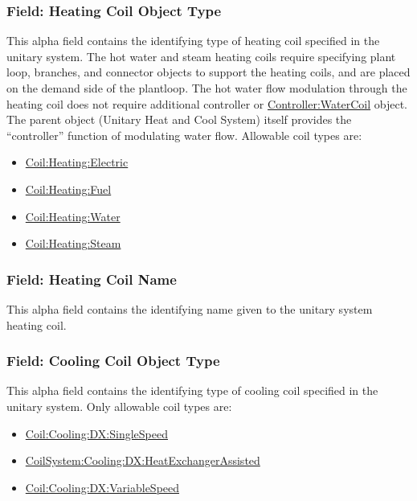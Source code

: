 \subsubsection{Field: Heating Coil Object Type}\label{field-heating-coil-object-type-2}

This alpha field contains the identifying type of heating coil specified in the unitary system. The hot water and steam heating coils require specifying plant loop, branches, and connector objects to support the heating coils, and are placed on the demand side of the plantloop. The hot water flow modulation through the heating coil does not require additional controller or \hyperref[controllerwatercoil]{Controller:WaterCoil} object. The parent object (Unitary Heat and Cool System) itself provides the ``controller'' function of modulating water flow. Allowable coil types are:

\begin{itemize}
\item
  \hyperref[coilheatingelectric]{Coil:Heating:Electric}
\item
  \hyperref[coilheatinggas-000]{Coil:Heating:Fuel}
\item
  \hyperref[coilheatingwater]{Coil:Heating:Water}
\item
  \hyperref[coilheatingsteam]{Coil:Heating:Steam}
\end{itemize}

\subsubsection{Field: Heating Coil Name}\label{field-heating-coil-name-2}

This alpha field contains the identifying name given to the unitary system heating coil.

\subsubsection{Field: Cooling Coil Object Type}\label{field-cooling-coil-object-type-2-000}

This alpha field contains the identifying type of cooling coil specified in the unitary system. Only allowable coil types are:

\begin{itemize}
\item
  \hyperref[coilcoolingdxsinglespeed]{Coil:Cooling:DX:SingleSpeed}
\item
  \hyperref[coilsystemcoolingdxheatexchangerassisted]{CoilSystem:Cooling:DX:HeatExchangerAssisted}
\item
  \hyperref[coilcoolingdxvariablespeed]{Coil:Cooling:DX:VariableSpeed}
\end{itemize}


